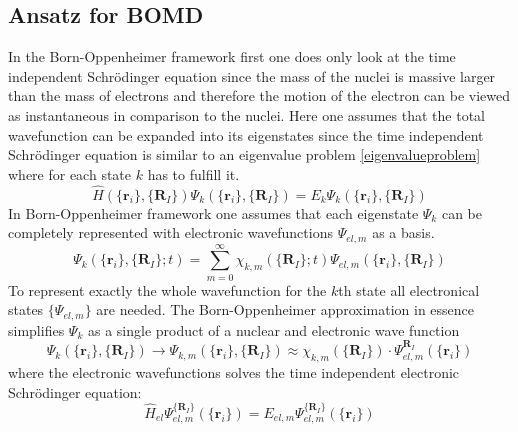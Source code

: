 \documentclass[12pt]{scrartcl}
\begin{document}
\subsection{Ansatz for BOMD}
In the Born-Oppenheimer framework first one does only look at the time independent Schr\"odinger equation since the mass of the nuclei is massive larger than the mass of electrons and therefore the motion of the electron can be viewed as instantaneous in comparison to the nuclei. Here one assumes that the total wavefunction can be expanded into its eigenstates since the time independent Schr\"odinger equation is similar to an eigenvalue problem \ref{eigenvalueproblem} where for each state $k$ has to fulfill it.
\begin{equation}
\hat{H}(\{\mathbf{r}_i\},\{\mathbf{R}_I\}) \Psi_k(\{\mathbf{r}_i\},\{\mathbf{R}_I\}) = E_k\Psi_k(\{\mathbf{r}_i\},\{\mathbf{R}_I\})\label{eq:tise}
\end{equation}
In Born-Oppenheimer framework one assumes that each eigenstate $\Psi_k$ can be completely represented with electronic wavefunctions $\Psi_{el,m}$ as a basis.
\begin{equation}
\Psi_k( \{ \mathbf{r}_i \}, \{ \mathbf{R}_I \};t) = \sum_{m=0}^{\infty} \chi_{k,m}( \{ \mathbf{R}_I \};t)\Psi_{el,m}( \{ \mathbf{r}_i \},\{ \mathbf{R}_I \})\label{basis:exact}
\end{equation}
To represent exactly the whole wavefunction for the $k$th state all electronical states $\{\Psi_{el,m}\}$ are needed. 
The Born-Oppenheimer approximation in essence simplifies $\Psi_k$ as a single product of a nuclear and electronic wave function
\begin{equation}
\Psi_k( \{ \mathbf{r}_i \}, \{ \mathbf{R}_I \}) \to \Psi_{k,m}( \{ \mathbf{r}_i \}, \{ \mathbf{R}_I \})\approx \chi_{k,m}(\{ \mathbf{R}_I \})\cdot\Psi_{el,m}^{\mathbf{R}_I}(\{ \mathbf{r}_i \})\label{ansatz:bo}
\end{equation}
where the electronic wavefunctions solves the time independent electronic Schr\"odinger equation:
\begin{equation}
\hat{H}_{el}\Psi_{el,m}^{\{\mathbf{R}_I\}}(\{\mathbf{r}_i\}) = E_{el,m} \Psi_{el,m}^{\{\mathbf{R}_I\}}(\{\mathbf{r}_i\})\label{eq:tiese}
\end{equation}
\end{document}
